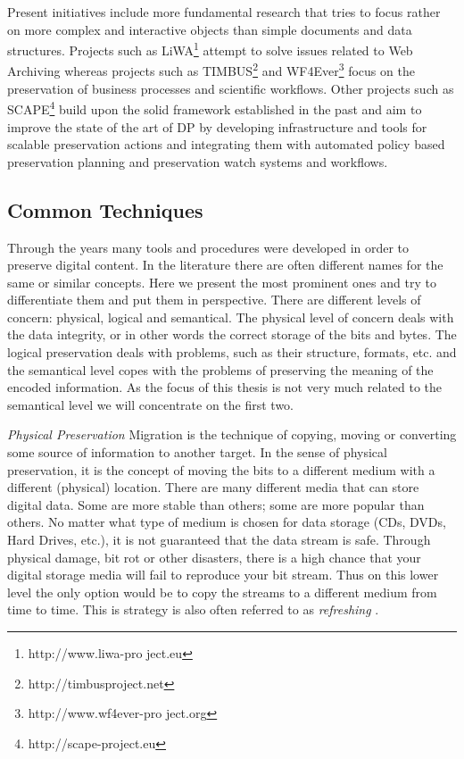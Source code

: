 Present initiatives include more fundamental research that tries to focus rather on more complex and interactive objects than simple documents and data structures. Projects such as LiWA\footnote{http://www.liwa-pro ject.eu} attempt to solve issues related to Web Archiving whereas projects such as TIMBUS\footnote{http://timbusproject.net} and WF4Ever\footnote{http://www.wf4ever-pro ject.org} focus on the preservation of business processes and scientific workflows.
Other projects such as SCAPE\footnote{http://scape-project.eu} build upon the solid framework established in the past and aim to improve the state of the art of DP by developing infrastructure and tools for scalable preservation actions and integrating them with automated policy based preservation planning and preservation watch systems and workflows.

\subsection{Common Techniques}
Through the years many tools and procedures were developed in order to preserve digital content. In the literature there are often different names for the same or similar concepts. Here we present the most prominent ones and try to differentiate them and put them in perspective. There are different levels of concern: physical, logical and semantical.
The physical level of concern deals with the data integrity, or in other words the correct storage of the bits and bytes. The logical preservation deals with problems, such as their structure, formats, etc. and the semantical level copes with the problems of preserving the meaning of the encoded information. As the focus of this thesis is not very much related to the semantical level we will concentrate on the first two. \newline

\textit{Physical Preservation}\newline
Migration is the technique of copying, moving or converting some source of information to another target. In the sense of physical preservation, it is the concept of moving the bits to a different medium with a different (physical) location. There are many different media that can store digital data. Some are more stable than others; some are more popular than others. No matter what type of medium is chosen for data storage (CDs, DVDs, Hard Drives, etc.), it is not guaranteed that the data stream is safe. Through physical damage, bit rot or other disasters, there is a high chance that your digital storage media will fail to reproduce your bit stream. Thus on this lower level the only option would be to copy the streams to a different medium from time to time. This is strategy is also often referred to as \textit{refreshing} \cite{Lee:2002:SOTADP}.

